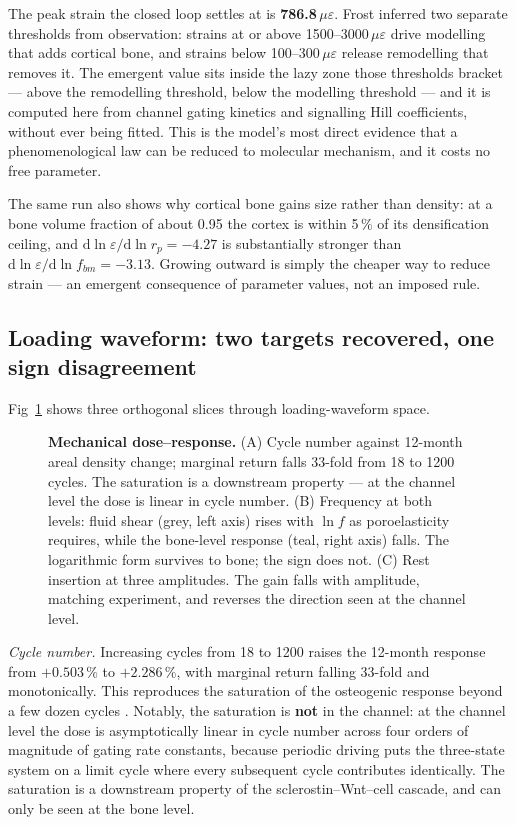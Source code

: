 \documentclass[10pt,letterpaper]{article}
\newcommand{\ue}{\ensuremath{\mu\varepsilon}}
\begin{document}
The peak strain the closed loop settles at is \textbf{786.8\,\ue}. Frost
\cite{frost1987} inferred two separate thresholds from observation: strains at
or above 1500--3000\,\ue{} drive modelling that adds cortical bone, and strains
below 100--300\,\ue{} release remodelling that removes it. The emergent value
sits inside the lazy zone those thresholds bracket --- above the remodelling
threshold, below the modelling threshold --- and it is computed here from
channel gating kinetics and signalling Hill coefficients, without ever being
fitted. This is the model's most direct evidence that a phenomenological law
can be reduced to molecular mechanism, and it costs no free parameter.

The same run also shows why cortical bone gains size rather than density: at a
bone volume fraction of about 0.95 the cortex is within 5\,\% of its
densification ceiling, and
$\mathrm{d}\ln\varepsilon/\mathrm{d}\ln r_p = -4.27$ is substantially stronger
than $\mathrm{d}\ln\varepsilon/\mathrm{d}\ln f_{bm} = -3.13$. Growing outward
is simply the cheaper way to reduce strain --- an emergent consequence of
parameter values, not an imposed rule.

\subsection*{Loading waveform: two targets recovered, one sign disagreement}

Fig~\ref{fig2} shows three orthogonal slices through loading-waveform space.

\begin{figure}[!h]
\caption{{\bf Mechanical dose--response.}
(A) Cycle number against 12-month areal density change; marginal return falls
33-fold from 18 to 1200 cycles. The saturation is a downstream property ---
at the channel level the dose is linear in cycle number. (B) Frequency at
both levels: fluid shear (grey, left axis) rises with $\ln f$ as
poroelasticity requires, while the bone-level response (teal, right axis)
falls. The logarithmic form survives to bone; the sign does not. (C) Rest
insertion at three amplitudes. The gain falls with amplitude, matching
experiment, and reverses the direction seen at the channel level.}
\label{fig2}
\end{figure}

\emph{Cycle number.} Increasing cycles from 18 to 1200 raises the 12-month
response from $+0.503\,\%$ to $+2.286\,\%$, with marginal return falling
33-fold and monotonically. This reproduces the saturation of the osteogenic
response beyond a few dozen cycles \cite{yang2017}. Notably, the saturation is
\textbf{not} in the channel: at the channel level the dose is asymptotically
linear in cycle number across four orders of magnitude of gating rate
constants, because periodic driving puts the three-state system on a limit
cycle where every subsequent cycle contributes identically. The saturation is
a downstream property of the sclerostin--Wnt--cell cascade, and can only be
seen at the bone level.
\end{document}
